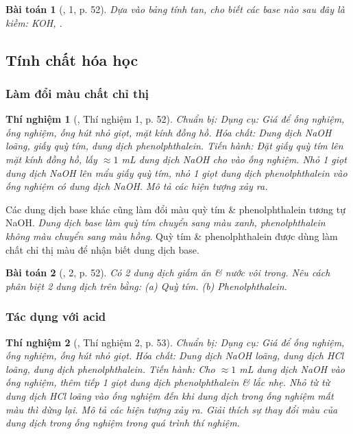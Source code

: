 \documentclass{article}
\newtheorem{baitoan}{Bài toán}
\newtheorem{thinghiem}{Thí nghiệm}
\begin{document}
\begin{baitoan}[\cite{SGK_KHTN_8_Canh_Dieu}, 1, p. 52]
	Dựa vào bảng tính tan, cho biết các base nào sau đây là kiềm: \emph{KOH, }.
\end{baitoan}

\subsection{Tính chất hóa học}

\subsubsection{Làm đổi màu chất chỉ thị}

\begin{thinghiem}[\cite{SGK_KHTN_8_Canh_Dieu}, Thí nghiệm 1, p. 52]
	\emph{Chuẩn bị:} Dụng cụ: Giá để ống nghiệm, ống nghiệm, ống hút nhỏ giọt, mặt kính đồng hồ. Hóa chất: Dung dịch \emph{NaOH} loãng, giấy quỳ tím, dung dịch phenolphthalein. \emph{Tiến hành:} Đặt giấy quỳ tím lên mặt kính đồng hồ, lấy $\approx1$ \emph{mL} dung dịch \emph{NaOH} cho vào ống nghiệm. Nhỏ 1 giọt dung dịch \emph{NaOH} lên mẩu giấy quỳ tím, nhỏ 1 giọt dung dịch phenolphthalein vào ống nghiệm có dung dịch \emph{NaOH}. Mô tả các hiện tượng xảy ra.
\end{thinghiem}
Các dung dịch base khác cũng làm đổi màu quỳ tím \& phenolphthalein tương tự NaOH. \textit{Dung dịch base làm quỳ tím chuyển sang màu xanh, phenolphthalein không màu chuyển sang màu hồng}. Quỳ tím \& phenolphthalein được dùng làm chất chỉ thị màu để nhận biết dung dịch base.

\begin{baitoan}[\cite{SGK_KHTN_8_Canh_Dieu}, 2, p. 52]
	Có 2 dung dịch giấm ăn \& nước vôi trong. Nêu cách phân biệt 2 dung dịch trên bằng: (a) Quỳ tím. (b) Phenolphthalein.
\end{baitoan}

\subsubsection{Tác dụng với acid}

\begin{thinghiem}[\cite{SGK_KHTN_8_Canh_Dieu}, Thí nghiệm 2, p. 53]
	\emph{Chuẩn bị:} Dụng cụ: Giá để ống nghiệm, ống nghiệm, ống hút nhỏ giọt. Hóa chất: Dung dịch \emph{NaOH} loãng, dung dịch \emph{HCl} loãng, dung dịch phenolphthalein. \emph{Tiến hành:} Cho $\approx1$ \emph{mL} dung dịch \emph{NaOH} vào ống nghiệm, thêm tiếp 1 giọt dung dịch phenolphthalein \& lắc nhẹ. Nhỏ từ từ dung dịch \emph{HCl} loãng vào ống nghiệm đến khi dung dịch trong ống nghiệm mất màu thì dừng lại. Mô tả các hiện tượng xảy ra. Giải thích sự thay đổi màu của dung dịch trong ống nghiệm trong quá trình thí nghiệm.
\end{thinghiem}
\end{document}
